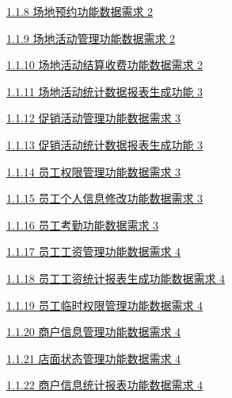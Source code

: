 \documentclass[]{article}
\begin{document}
\protect\hyperlink{ux573aux5730ux9884ux7ea6ux529fux80fdux6570ux636eux9700ux6c42}{1.1.8
场地预约功能数据需求 2}

\protect\hyperlink{ux573aux5730ux6d3bux52a8ux7ba1ux7406ux529fux80fdux6570ux636eux9700ux6c42}{1.1.9
场地活动管理功能数据需求 2}

\protect\hyperlink{ux573aux5730ux6d3bux52a8ux7ed3ux7b97ux6536ux8d39ux529fux80fdux6570ux636eux9700ux6c42}{1.1.10
场地活动结算收费功能数据需求 2}

\protect\hyperlink{ux573aux5730ux6d3bux52a8ux7edfux8ba1ux6570ux636eux62a5ux8868ux751fux6210ux529fux80fd}{1.1.11
场地活动统计数据报表生成功能 3}

\protect\hyperlink{ux4fc3ux9500ux6d3bux52a8ux7ba1ux7406ux529fux80fdux6570ux636eux9700ux6c42}{1.1.12
促销活动管理功能数据需求 3}

\protect\hyperlink{ux4fc3ux9500ux6d3bux52a8ux7edfux8ba1ux6570ux636eux62a5ux8868ux751fux6210ux529fux80fd}{1.1.13
促销活动统计数据报表生成功能 3}

\protect\hyperlink{ux5458ux5de5ux6743ux9650ux7ba1ux7406ux529fux80fdux6570ux636eux9700ux6c42}{1.1.14
员工权限管理功能数据需求 3}

\protect\hyperlink{ux5458ux5de5ux4e2aux4ebaux4fe1ux606fux4feeux6539ux529fux80fdux6570ux636eux9700ux6c42}{1.1.15
员工个人信息修改功能数据需求 3}

\protect\hyperlink{ux5458ux5de5ux8003ux52e4ux529fux80fdux6570ux636eux9700ux6c42}{1.1.16
员工考勤功能数据需求 3}

\protect\hyperlink{ux5458ux5de5ux5de5ux8d44ux7ba1ux7406ux529fux80fdux6570ux636eux9700ux6c42}{1.1.17
员工工资管理功能数据需求 4}

\protect\hyperlink{ux5458ux5de5ux5de5ux8d44ux7edfux8ba1ux62a5ux8868ux751fux6210ux529fux80fdux6570ux636eux9700ux6c42}{1.1.18
员工工资统计报表生成功能数据需求 4}

\protect\hyperlink{ux5458ux5de5ux4e34ux65f6ux6743ux9650ux7ba1ux7406ux529fux80fdux6570ux636eux9700ux6c42}{1.1.19
员工临时权限管理功能数据需求 4}

\protect\hyperlink{ux5546ux6237ux4fe1ux606fux7ba1ux7406ux529fux80fdux6570ux636eux9700ux6c42}{1.1.20
商户信息管理功能数据需求 4}

\protect\hyperlink{ux5e97ux9762ux72b6ux6001ux7ba1ux7406ux529fux80fdux6570ux636eux9700ux6c42}{1.1.21
店面状态管理功能数据需求 4}

\protect\hyperlink{ux5546ux6237ux4fe1ux606fux7edfux8ba1ux62a5ux8868ux529fux80fdux6570ux636eux9700ux6c42}{1.1.22
商户信息统计报表功能数据需求 4}
\end{document}
